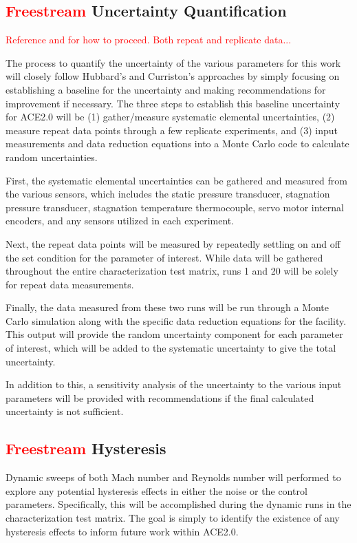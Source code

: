 \subsection{\textcolor{red}{Freestream} Uncertainty Quantification}

\textcolor{red}{Reference \cite{stephens-hubbard} and \cite{curriston} for how to proceed. Both repeat and replicate data...}

The process to quantify the uncertainty of the various parameters for this work will closely follow Hubbard's and Curriston's approaches by simply focusing on establishing a baseline for the uncertainty and making recommendations for improvement if necessary. The three steps to establish this baseline uncertainty for ACE2.0 will be (1) gather/measure systematic elemental uncertainties, (2) measure repeat data points through a few replicate experiments, and (3) input measurements and data reduction equations into a Monte Carlo code to calculate random uncertainties.

First, the systematic elemental uncertainties can be gathered and measured from the various sensors, which includes the static pressure transducer, stagnation pressure transducer, stagnation temperature thermocouple, servo motor internal encoders, and any sensors utilized in each experiment. 

Next, the repeat data points will be measured by repeatedly settling on and off the set condition for the parameter of interest. While data will be gathered throughout the entire characterization test matrix, runs 1 and 20 will be solely for repeat data measurements. 

Finally, the data measured from these two runs will be run through a Monte Carlo simulation along with the specific data reduction equations for the facility. This output will provide the random uncertainty component for each parameter of interest, which will be added to the systematic uncertainty to give the total uncertainty.

In addition to this, a sensitivity analysis of the uncertainty to the various input parameters will be provided with recommendations if the final calculated uncertainty is not sufficient.

\subsection{\textcolor{red}{Freestream} Hysteresis}

Dynamic sweeps of both Mach number and Reynolds number will performed to explore any potential hysteresis effects in either the noise or the control parameters. Specifically, this will be accomplished during the dynamic runs in the characterization test matrix. The goal is simply to identify the existence of any hysteresis effects to inform future work within ACE2.0.

